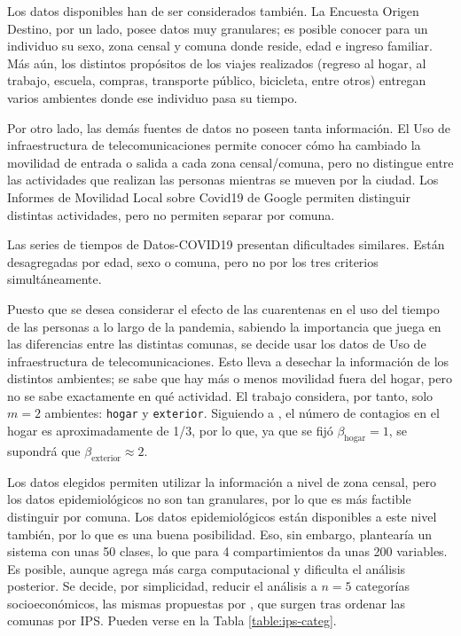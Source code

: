 Los datos disponibles han de ser considerados también. La Encuesta Origen Destino, por un lado, posee datos muy granulares; es posible conocer para un individuo su sexo, zona censal y comuna donde reside, edad e ingreso familiar. Más aún, los distintos propósitos de los viajes realizados (regreso al hogar, al trabajo, escuela, compras, transporte público, bicicleta, entre otros) entregan varios ambientes donde ese individuo pasa su tiempo. 

Por otro lado, las demás fuentes de datos no poseen tanta información. El Uso de infraestructura de telecomunicaciones permite conocer cómo ha cambiado la movilidad de entrada o salida a cada zona censal/comuna, pero no distingue entre las actividades que realizan las personas mientras se mueven por la ciudad. Los Informes de Movilidad Local sobre Covid19 de Google permiten distinguir distintas actividades, pero no permiten separar por comuna.

Las series de tiempos de Datos-COVID19 presentan dificultades similares. Están desagregadas por edad, sexo o comuna, pero no por los tres criterios simultáneamente.

Puesto que se desea considerar el efecto de las cuarentenas en el uso del tiempo de las personas a lo largo de la pandemia, sabiendo la importancia que juega en las diferencias entre las distintas comunas, se decide usar los datos de Uso de infraestructura de telecomunicaciones. Esto lleva a desechar la información de los distintos ambientes; se sabe que hay más o menos movilidad fuera del hogar, pero no se sabe exactamente en qué actividad. El trabajo considera, por tanto, solo \(m = 2\) ambientes: \texttt{hogar} y \texttt{exterior}. Siguiendo a \cite{Ferguson2020}, el número de contagios en el hogar es aproximadamente de 1/3, por lo que, ya que se fijó \(\beta_{\text{hogar}} = 1\), se supondrá que \(\beta_{\text{exterior}} \approx 2\).

Los datos elegidos permiten utilizar la información a nivel de zona censal, pero los datos epidemiológicos no son tan granulares, por lo que es más factible distinguir por comuna. Los datos epidemiológicos están disponibles a este nivel también, por lo que es una buena posibilidad. Eso, sin embargo, plantearía un sistema con unas 50 clases, lo que para 4 compartimientos da unas 200 variables. Es posible, aunque agrega más carga computacional y dificulta el análisis posterior. Se decide, por simplicidad, reducir el análisis a \(n = 5\) categorías socioeconómicos, las mismas propuestas por \cite{SEREMIRM2019}, que surgen tras ordenar las comunas por IPS. Pueden verse en la Tabla \ref{table:ips-categ}.

